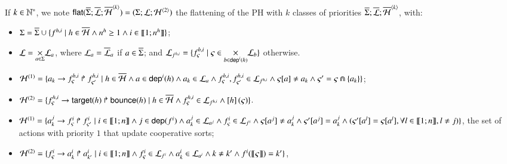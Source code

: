 \begin{definition}
  \label{def:flattening}
  If $k \in \mathbb{N}^*$, we note $\mathsf{flat}(\overline{\Sigma}; \overline{\mathcal{L}}; \overline{\mathcal{H}}^{{\langle k \rangle}}) = (\Sigma; \mathcal{L}; \mathcal{H}^{{\langle 2 \rangle}})$
  the flattening of the PH with $k$ classes of priorities $\overline{\Sigma}; \overline{\mathcal{L}}; \overline{\mathcal{H}}^{{\langle k \rangle}}$, with:
  \begin{itemize}
    \item $\Sigma = \overline{\Sigma} \cup \{ f^{h,i} \mid h \in \overline{\mathcal{H}} \wedge n^{h} \geq 1 \wedge i \in \llbracket 1; n^{h} \rrbracket \}$;
    \item $\mathcal{L} = \underset{a \in \Sigma}{\times} \mathcal{L}_{a}$, where
      $\mathcal{L}_{a} = \overline{\mathcal{L}}_{a}$ if $a \in \overline{\Sigma}$; and 
      $\mathcal{L}_{f^{h,i}} = \{ f^{h,i}_\varsigma \mid \varsigma \in \underset{b \in \mathsf{dep}^{i}(h)}{\times} \mathcal{L}_{b} \}$ otherwise.
    \item $\PHh^{(1)} = \{ \PHhit{a_k}{f^{h,i}_\varsigma}{f^{h,i}_{\varsigma'}} \mid
      h \in \ov{\PHh} \wedge %
      a \in \PHdep{i}{h} \wedge a_k \in \PHl_a \wedge
      f^{h,i}_\varsigma , f^{h,i}_{\varsigma'} \in \PHl_{f^{h,i}} \wedge
      \PHget{\varsigma}{a} \neq a_k \wedge \varsigma' = \varsigma \Cap \{ a_k \} \}$;
    \item $\mathcal{H}^{(2)}=\{ f^{h,i}_\varsigma\rightarrow\mathsf{target}(h)\Rsh\mathsf{bounce}(h) \mid
      h \in \overline{\mathcal{H}} \wedge f^{h,i}_\varsigma \in \mathcal{L}_{f^{h,i}} \wedge \left[h\right](\varsigma) \}$.




    \item $\mathcal{H}^{(1)}= \{ a^j_k\rightarrow f^i_\varsigma\Rsh f^i_{\varsigma'}
      \mid i\in\llbracket 1; n \rrbracket \wedge
      j\in\mathsf{dep}(f^i) \wedge a^j_k\in \mathcal{L}_{a^j} \wedge f^i_\varsigma\in \mathcal{L}_{f^i}
      \wedge
      \varsigma[{a^j}]\neq a^j_k 
      \wedge \varsigma'[{a^j}]=a^j_k
      \wedge (\varsigma'[{a^{l}}]=\varsigma[{a^l}],
      \forall l\in\llbracket 1; n \rrbracket,l\neq j)
      \}$, 
      the set of actions with priority $1$ that update cooperative sorts;

          \item $\mathcal{H}^{(2)}=\{ f^i_\varsigma\rightarrow a^i_k\Rsh a^i_{k'} \mid i\in\llbracket 1; n \rrbracket \wedge
          f^i_\varsigma\in \mathcal{L}_{f^i} \wedge
          a^i_k\in \mathcal{L}_{a^i}\wedge k\neq k' \wedge f^i(\llbracket\varsigma\rrbracket) = k'
        \}$,

  \end{itemize}

\end{definition}





